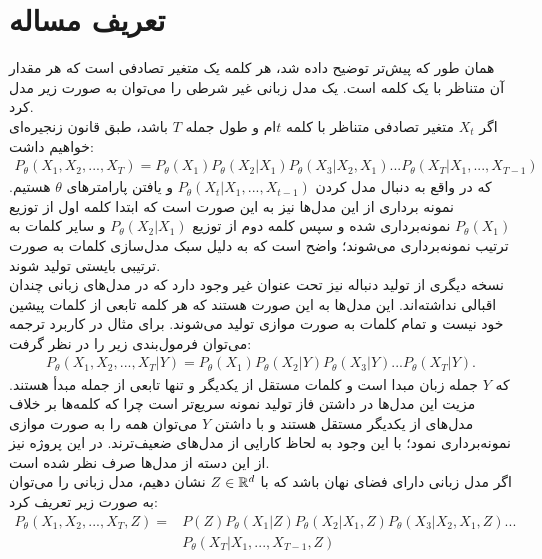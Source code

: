 \section{تعریف مساله} \label{chap1:prob_define}
همان طور که پیش‌تر توضیح داده شد، هر کلمه یک متغیر تصادفی است که هر مقدار آن متناظر با یک کلمه است. یک مدل زبانی غیر شرطی \autoregressive{} را می‌توان به صورت زیر مدل کرد.\\
اگر $X_t$ متغیر تصادفی متناظر با کلمه $t$ام و طول جمله $T$ باشد، طبق قانون زنجیره‌ای خواهیم داشت:
\begin{equation}\begin{split}
P_\theta(X_1, X_2, ... , X_T) = P_\theta(X_1) P_\theta(X_2|X_1) P_\theta(X_3|X_2, X_1) ... P_\theta(X_T|X_1, ..., X_{T-1})
\end{split}\end{equation}
که در واقع به دنبال مدل کردن $P_\theta(X_t|X_1, ..., X_{t-1 })$ و یافتن پارامتر‌های $\theta$ هستیم. نمونه برداری از این مدل‌ها نیز به این صورت است که ابتدا کلمه اول از توزیع $P_\theta(X_1)$ نمونه‌برداری شده و سپس کلمه دوم از توزیع $P_\theta(X_2|X_1)$ و سایر کلمات به ترتیب نمونه‌برداری می‌شوند؛ واضح است که به دلیل سبک مدل‌سازی کلمات به صورت ترتیبی بایستی تولید شوند. \\
نسخه دیگری از تولید دنباله نیز تحت عنوان غیر \autoregressive{} وجود دارد که در مدل‌های زبانی چندان اقبالی نداشته‌اند. این مدل‌ها به این صورت هستند که هر کلمه تابعی از کلمات پیشین خود نیست و تمام کلمات به صورت موازی تولید می‌شوند. برای مثال در کاربرد ترجمه می‌توان فرمول‌بندی زیر را در نظر گرفت:
\begin{align}
P_\theta(X_1, X_2, ... , X_T|Y) = P_\theta(X_1) P_\theta(X_2|Y) P_\theta(X_3|Y) ... P_\theta(X_T|Y).
\end{align}
که $Y$ جمله زبان مبدا است و کلمات مستقل از یکدیگر و تنها تابعی از جمله مبدأ هستند. مزیت این مدل‌ها در داشتن فاز تولید نمونه سریع‌تر است چرا که کلمه‌ها بر خلاف مدل‌های \autoregressive{} از یکدیگر مستقل هستند و با داشتن $Y$ می‌توان همه را به صورت موازی نمونه‌برداری نمود؛ با این وجود به لحاظ کارایی از مدل‌های \autoregressive{} ضعیف‌ترند. در این پروژه نیز از این دسته از مدل‌ها صرف نظر شده است.
\\
اگر مدل زبانی دارای فضای نهان باشد که با $Z \in {\mathbb{R}}^d$ نشان دهیم، مدل زبانی را می‌توان به صورت زیر تعریف کرد:
\begin{align}
P_\theta(X_1, X_2, ... , X_T,Z) =&P(Z) P_\theta(X_1|Z) P_\theta(X_2|X_1,Z) P_\theta(X_3|X_2, X_1,Z) ... \nonumber\\& P_\theta(X_T|X_1, ..., X_{T-1},Z)
\end{align}
